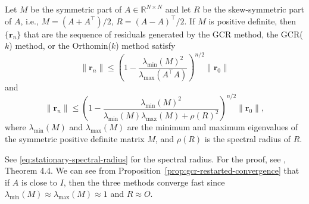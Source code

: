 \begin{Proposition}\label{prop:gcr-restarted-convergence}
{Let $M$ be the symmetric part of $A\in\mathbb R^{N\times N}$ and let $R$ be the skew-symmetric part of $A$, i.e., $M=(A+A^{\top})/2$, $R=(A-A)^{\top}/2$. If $M$ is positive definite, then $\{\bm r_n\}$ that are the sequence of residuals generated by the GCR method, the GCR($k$) method, or the Orthomin($k$) method satisfy}
\[\|\bm r_n\|\le\left(1-\frac{\lambda_{\min}(M)^2}{\lambda_{\max}(A^{\top}A)}\right)^{n/2}\|\bm r_0\|\]
{and}
\[\|\bm r_n\|\le\left(1-\frac{\lambda_{\min}(M)^2}{\lambda_{\min}(M)\lambda_{\max}(M)+\rho(R)^2}\right)^{n/2}\|\bm r_0\|,\]
{where $\lambda_{\min}(M)$ and $\lambda_{\max}(M)$ are the minimum and maximum eigenvalues of the symmetric positive definite matrix $M$, and $\rho(R)$ is the spectral radius of $R$.}
\end{Proposition}
{See \eqref{eq:stationary-spectral-radius} for the spectral radius. For the proof, see , Theorem 4.4.}
{We can see from Proposition\ \ref{prop:gcr-restarted-convergence} that if $A$ is close to $I$, then the three methods converge fast since $\lambda_{\min}(M)\approx\lambda_{\max}(M)\approx1$ and $R\approx O$.}
